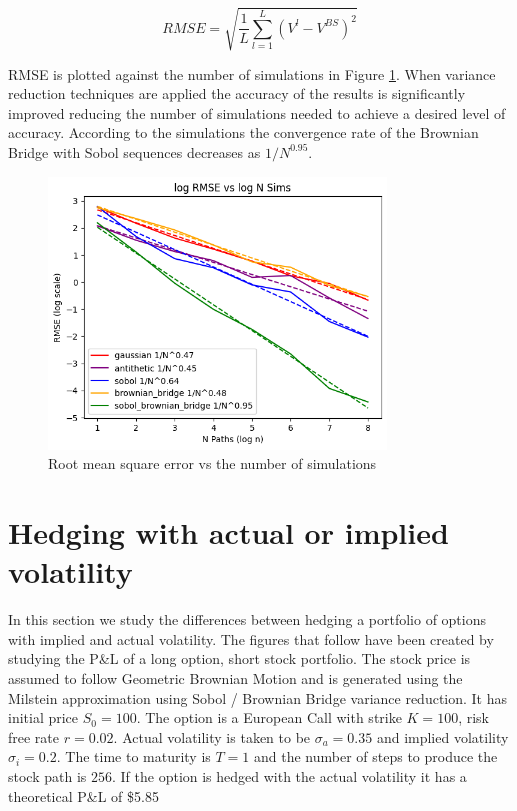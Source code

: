 \documentclass{article}
\begin{document}
\[
RMSE = \sqrt{\frac{1}{L} \sum_{l=1}^{L} (V^l - V^{BS})^2}
\]

RMSE is plotted against the number of simulations in Figure \ref{fig:rmse}. When variance reduction techniques are
applied the accuracy of the results is significantly improved reducing the number of simulations needed to achieve
a desired level of accuracy.  According to the simulations the convergence rate of the Brownian Bridge with Sobol sequences
decreases as $1/N^{0.95}$.

\begin{figure}[h]
    \centering
    \includegraphics[width=0.8\textwidth]{images/rmse.png}
    \caption{Root mean square error vs the number of simulations}
    \label{fig:rmse}
\end{figure}

\newpage
\newpage

\section{Hedging with actual or implied volatility}

In this section we study the differences between hedging a portfolio of options with implied and actual volatility.  The figures that follow have been created by 
studying the P\&L of a long option, short stock portfolio. The stock price is assumed to follow Geometric Brownian Motion and is generated using
the Milstein approximation using Sobol / Brownian Bridge variance reduction. It has initial price $S_0 = 100$. The option is a European Call with strike $K = 100$, risk free rate $r = 0.02$.
Actual volatility is taken to be $\sigma_a = 0.35$ and implied volatility $\sigma_i = 0.2$. The time to maturity is $T = 1$ and the number of steps to produce the stock path is $256$.
If the option is hedged with the actual volatility it has a theoretical P\&L of \$5.85
\end{document}
